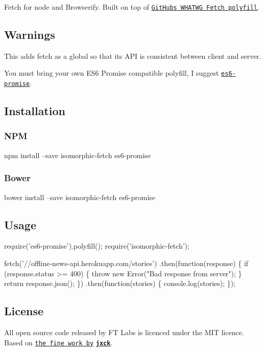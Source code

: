 Fetch for node and Browserify. Built on top of \href{https://github.com/github/fetch}{\tt Git\+Hub\textquotesingle{}s W\+H\+A\+T\+WG Fetch polyfill}.

\subsection*{Warnings}


\begin{DoxyItemize}
\item This adds {\ttfamily fetch} as a global so that its A\+PI is consistent between client and server.
\item You must bring your own E\+S6 Promise compatible polyfill, I suggest \href{https://github.com/jakearchibald/es6-promise}{\tt es6-\/promise}.
\end{DoxyItemize}

\subsection*{Installation}

\subsubsection*{N\+PM}


\begin{DoxyCode}
npm install --save isomorphic-fetch es6-promise
\end{DoxyCode}


\subsubsection*{Bower}


\begin{DoxyCode}
bower install --save isomorphic-fetch es6-promise
\end{DoxyCode}


\subsection*{Usage}


\begin{DoxyCode}
require('es6-promise').polyfill();
require('isomorphic-fetch');

fetch('//offline-news-api.herokuapp.com/stories')
    .then(function(response) \{
        if (response.status >= 400) \{
            throw new Error("Bad response from server");
        \}
        return response.json();
    \})
    .then(function(stories) \{
        console.log(stories);
    \});
\end{DoxyCode}


\subsection*{License}

All open source code released by FT Labs is licenced under the M\+IT licence. Based on \href{https://github.com/github/fetch/pull/31}{\tt the fine work by} {\bfseries \href{https://github.com/Jxck}{\tt jxck}}. 